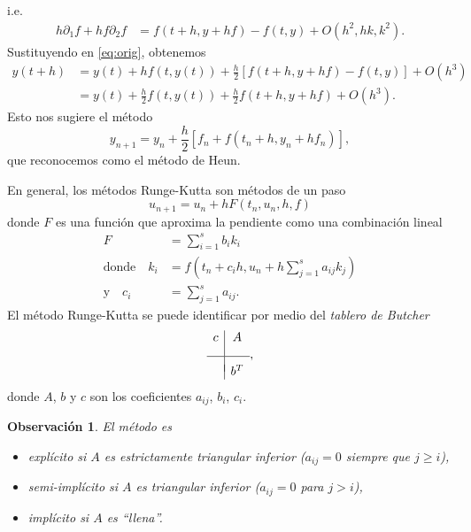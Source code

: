 \documentclass[11pt,letterpaper]{article}
\newtheorem{remark}{Observación}
\begin{document}
i.e.
\begin{align}
  h \partial _1 f + hf \partial _2 f
  &=
  f(t+h,y+hf) - f(t,y)
  + O(h^{2},hk,k^{2}).
\end{align}
Sustituyendo en \eqref{eq:orig}, obtenemos
\begin{align}\label{eq:sust}
  y(t+h)
  &= y(t)
    + hf(t,y(t))
    + \frac{h}{2}
    \left[
    f(t+h,y+hf) - f(t,y)
    \right]
    + O(h^{3})
  \\
  &= y(t)
    + \frac{h}{2} f(t,y(t))
    + \frac{h}{2} f(t+h,y+hf)
    + O(h^{3})
.\end{align}
Esto nos sugiere el método
\begin{equation}
  y_{n+1} = y_n + \frac{h}{2} \left[
    f_n + f(t_n + h, y_n + hf_n)
  \right]
,\end{equation}
que reconocemos como el método de Heun.

En general, los métodos Runge-Kutta son métodos de un paso
\begin{equation}
  u_{n+1} = u_n + h F(t_n,u_n,h,f)
\end{equation}
donde $F$ es una función que aproxima la pendiente como una
combinación lineal
\begin{align}
  F
    &=
    \sum_{i=1}^{s}b_ik_i
  \\[-3mm]
  \text{donde} \quad
  k_i
    &= f(t_n+c_ih, u_n+h \sum_{j=1}^{s}a_{ij} k_j)
    \\[-4mm]
  \text{y} \quad
  c_i
    &= \sum_{j=1}^{s}a_{ij}
.\end{align}
El método Runge-Kutta  se puede identificar por medio del
\emph{tablero de Butcher}
\begin{equation}
  \begin{array}{c|c}
    c & A \\[3mm]
    \hline \\[-2mm]
      & b^{T}
  \end{array}
,\end{equation}
donde $A$, $b$ y $c$ son los coeficientes $a_{ij}$, $b_i$, $c_i$.

\begin{remark}
  El método es
  \begin{itemize}
    \item
      explícito si $A$ es estrictamente triangular inferior
      ($a_{ij}=0$ siempre que $j\geq i$),
    \item
      semi-implícito si $A$ es triangular inferior ($a_{ij}=0$ para
      $j>i$),
    \item
      implícito si $A$ es ``llena''.
  \end{itemize}
\end{remark}
\end{document}
